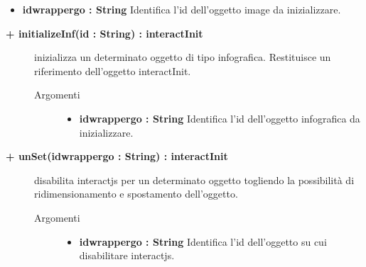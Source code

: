 \begin{description}
\begin{description}
\begin{description}
\begin{itemize}
					\item \textbf{idwrappergo : String			} \hfill
						Identifica l'id dell'oggetto image da inizializzare.
					
				\end{itemize}
		\end{description}
	\end{description}
	
\begin{description}
		\item[\textbf{\color{blue}+ initializeInf(id : String) : interactInit			}] \hfill
			inizializza un determinato oggetto di tipo infografica. Restituisce un riferimento dell'oggetto interactInit.
			
		\begin{description}
			\item[Argomenti] \hfill
				\begin{itemize}
				
					\item \textbf{idwrappergo : String			} \hfill
						Identifica l'id dell'oggetto infografica da inizializzare.
					
				\end{itemize}
		\end{description}
	\end{description}

\begin{description}
		\item[\textbf{\color{blue}+ unSet(idwrappergo : String) : interactInit			}] \hfill
			disabilita interactjs per un determinato oggetto togliendo la possibilità di ridimensionamento e spostamento dell'oggetto.
			
		\begin{description}
			\item[Argomenti] \hfill
				\begin{itemize}
				
					\item \textbf{idwrappergo : String			} \hfill
						Identifica l'id dell'oggetto su cui disabilitare interactjs.
					
				\end{itemize}
		\end{description}
	\end{description}
		
	
	
	
\end{description}

